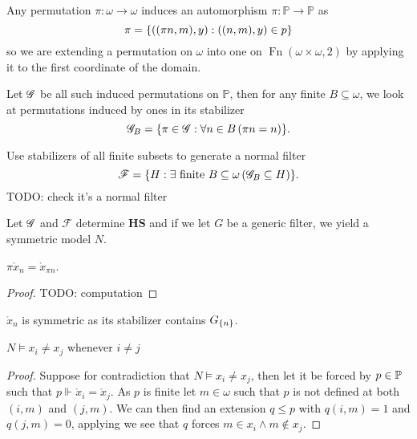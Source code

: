 Any permutation \(\pi: \omega \to \omega\) induces an automorphism \(\pi: \mathbb{P}\to\mathbb{P}\) as
\[ \pi = \set{((\pi n, m), y): ((n,m),y) \in p} \]
so we are extending a permutation on \(\omega\) into one on \(\operatorname{Fn}(\omega\times\omega, 2)\)
by applying it to the first coordinate of the domain.

Let \(\G\) be all such induced permutations on \(\mathbb{P}\), then for any finite \(B\subseteq \omega\),
we look at permutations induced by ones in its stabilizer
\[ \G_B = \set{ \pi\in \G: \forall n\in B\left( \pi n = n \right) }. \]

Use stabilizers of all finite subsets to generate a normal filter
\[ \mathscr{F} = \set{H: \exists \text{ finite } B\subseteq \omega \left(\G_B \subseteq H\right) }. \]
TODO: check it's a normal filter

Let \(\G\) and \(\mathscr{F}\) determine \(\mathbf{HS}\) and if we let \(G\) be a generic filter, we yield a symmetric model \(N\).

\begin{lemma}
    \(\pi \mathring{x}_n = \mathring{x}_{\pi n} \).
\end{lemma}
\begin{proof}
    TODO: computation
\end{proof}
\begin{corollary}
    \(\mathring{x}_n\) is symmetric as its stabilizer contains \(G_\set{n}\).
\end{corollary}

\begin{lemma}
    \(N\models x_i\ne x_j\) whenever \(i\ne j\)
\end{lemma}
\begin{proof}
    Suppose for contradiction that \(N\models x_i\ne x_j\),
    then let it be forced by \(p\in \P\) such that \(p\Vdash \mathring{x}_i = \mathring{x}_j\).
    As \(p\) is finite let \(m\in\omega\) such that \(p\) is not defined at both \((i,m)\) and \((j,m)\).
    We can then find an extension \(q\leq p\) with \(q(i,m) = 1\) and \(q(j,m) = 0\),
    applying 
    we see that \(q\) forces \(m\in x_i \land m\notin x_j\).
\end{proof}

